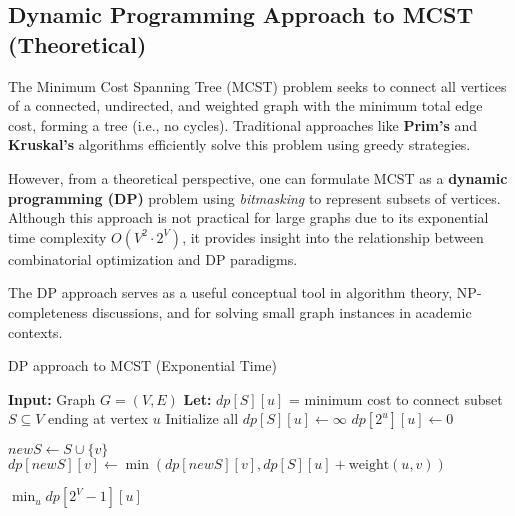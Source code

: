 \documentclass[14pt,a4paper]{extarticle}
\begin{document}
\subsection{Dynamic Programming Approach to MCST (Theoretical)}

The Minimum Cost Spanning Tree (MCST) problem seeks to connect all vertices of a connected, undirected, 
and weighted graph with the minimum total edge cost, forming a tree (i.e., no cycles). Traditional approaches 
like \textbf{Prim’s} and \textbf{Kruskal’s} algorithms efficiently solve this problem using greedy strategies.

However, from a theoretical perspective, one can formulate MCST as a \textbf{dynamic programming (DP)} 
problem using \textit{bitmasking} to represent subsets of vertices. Although this approach is not practical 
for large graphs due to its exponential time complexity \( O(V^2 \cdot 2^V) \), it provides insight into the 
relationship between combinatorial optimization and DP paradigms.

The DP approach serves as a useful conceptual tool in algorithm theory, NP-completeness discussions, and for 
solving small graph instances in academic contexts.

\begin{algorithm}[H]
\caption{DP approach to MCST (Exponential Time)}
\begin{algorithmic}[1]
\State \textbf{Input:} Graph \( G = (V, E) \)
\State \textbf{Let:} \( dp[S][u] \) = minimum cost to connect subset \( S \subseteq V \) ending at vertex \( u \)
\State Initialize all \( dp[S][u] \gets \infty \)
    \State \( dp[2^u][u] \gets 0 \) 
\EndFor

                \State \( newS \gets S \cup \{v\} \)
                \State \( dp[newS][v] \gets \min(dp[newS][v], dp[S][u] + \text{weight}(u,v)) \)
            \EndIf
        \EndFor
    \EndFor
\EndFor

\State \Return \( \min_{u} dp[2^V - 1][u] \)
\end{algorithmic}
\end{algorithm}
\end{document}
